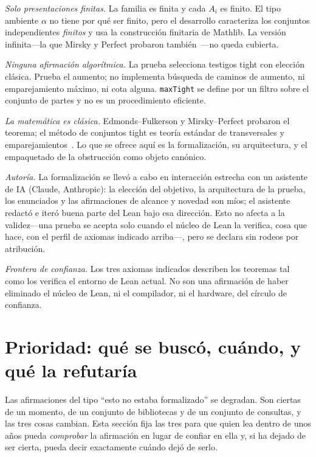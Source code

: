 \documentclass[11pt]{article}
\newcommand{\lean}[1]{\texttt{#1}}
\begin{document}
\emph{Solo presentaciones finitas.} La familia es finita y cada $A_i$ es finito. El tipo ambiente
$\alpha$ no tiene por qué ser finito, pero el desarrollo caracteriza los conjuntos independientes
\emph{finitos} y usa la construcción finitaria de Mathlib. La versión infinita---la que Mirsky y
Perfect probaron también~\cite{mirskyperfect}---no queda cubierta.

\emph{Ninguna afirmación algorítmica.} La prueba selecciona testigos tight con elección clásica.
Prueba el aumento; no implementa búsqueda de caminos de aumento, ni emparejamiento máximo, ni cota
alguna. \lean{maxTight} se define por un filtro sobre el conjunto de partes y no es un
procedimiento eficiente.

\emph{La matemática es clásica.} Edmonds--Fulkerson y Mirsky--Perfect probaron el teorema; el
método de conjuntos tight es teoría estándar de transversales y
emparejamientos~\cite{ore,dm,lovaszplummer,welsh,oxley}. Lo que se ofrece aquí es la formalización,
su arquitectura, y el empaquetado de la obstrucción como objeto canónico.

\emph{Autoría.} La formalización se llevó a cabo en interacción estrecha con un asistente de IA
(Claude, Anthropic): la elección del objetivo, la arquitectura de la prueba, los enunciados y las
afirmaciones de alcance y novedad son míos; el asistente redactó e iteró buena parte del Lean bajo
esa dirección. Esto no afecta a la validez---una prueba se acepta solo cuando el núcleo de Lean la
verifica, cosa que hace, con el perfil de axiomas indicado arriba---, pero se declara sin rodeos por
atribución.

\emph{Frontera de confianza.} Los tres axiomas indicados describen los teoremas tal como los
verifica el entorno de Lean actual. No son una afirmación de haber eliminado el núcleo de Lean, ni
el compilador, ni el hardware, del círculo de confianza.

\section{Prioridad: qué se buscó, cuándo, y qué la refutaría}\label{sec:priority}

Las afirmaciones del tipo ``esto no estaba formalizado'' se degradan. Son ciertas de un momento, de
un conjunto de bibliotecas y de un conjunto de consultas, y las tres cosas cambian. Esta sección
fija las tres para que quien lea dentro de unos años pueda \emph{comprobar} la afirmación en lugar
de confiar en ella y, si ha dejado de ser cierta, pueda decir exactamente cuándo dejó de serlo.
\end{document}
